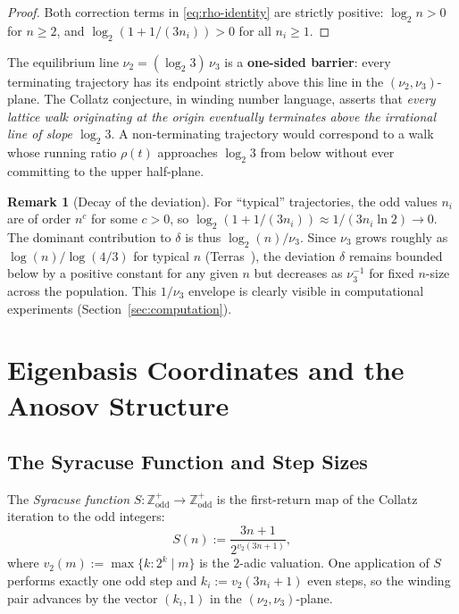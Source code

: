 \documentclass[11pt,a4paper]{article}
\newcommand{\Z}{\mathbb{Z}}
\theoremstyle{plain}
\theoremstyle{definition}
\newtheorem{remark}[theorem]{Remark}
\begin{document}
\begin{proof}
    Both correction terms in \eqref{eq:rho-identity} are strictly positive: $\log_2 n > 0$ for $n \geq 2$, and $\log_2(1 + 1/(3n_i)) > 0$ for all $n_i \geq 1$.
\end{proof}

\begin{keyinsight}
    The equilibrium line $\nu_2 = (\log_2 3)\, \nu_3$ is a \textbf{one-sided barrier}: every terminating trajectory has its endpoint strictly above this line in the $(\nu_2, \nu_3)$-plane. The Collatz conjecture, in winding number language, asserts that \emph{every lattice walk originating at the origin eventually terminates above the irrational line of slope $\log_2 3$}. A non-terminating trajectory would correspond to a walk whose running ratio $\rho(t)$ approaches $\log_2 3$ from below without ever committing to the upper half-plane.
\end{keyinsight}

\begin{remark}[Decay of the deviation]\label{rem:decay}
    For ``typical'' trajectories, the odd values $n_i$ are of order $n^{c}$ for some $c > 0$, so $\log_2(1 + 1/(3n_i)) \approx 1/(3n_i \ln 2) \to 0$. The dominant contribution to $\delta$ is thus $\log_2(n)/\nu_3$. Since $\nu_3$ grows roughly as $\log(n)/\log(4/3)$ for typical $n$ (Terras~\cite{Terras1976}), the deviation $\delta$ remains bounded below by a positive constant for any given $n$ but decreases as $\nu_3^{-1}$ for fixed $n$-size across the population. This $1/\nu_3$ envelope is clearly visible in computational experiments (Section~\ref{sec:computation}).
\end{remark}


\section{Eigenbasis Coordinates and the Anosov Structure}\label{sec:anosov}

\subsection{The Syracuse Function and Step Sizes}

The \emph{Syracuse function} $S: \Z_{\mathrm{odd}}^+ \to \Z_{\mathrm{odd}}^+$ is the first-return map of the Collatz iteration to the odd integers:
\begin{equation}\label{eq:syracuse}
    S(n) := \frac{3n + 1}{2^{v_2(3n+1)}},
\end{equation}
where $v_2(m) := \max\{k : 2^k \mid m\}$ is the $2$-adic valuation. One application of $S$ performs exactly one odd step and $k_i := v_2(3n_i + 1)$ even steps, so the winding pair advances by the vector $(k_i, 1)$ in the $(\nu_2, \nu_3)$-plane.
\end{document}
